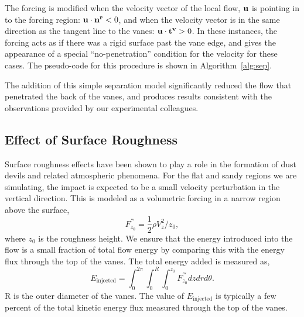 The forcing is modified when the velocity vector of the local flow, $\bf
u$ is pointing in to the forcing region: ${\bf u} \cdot {\bf n^r} < 0$, and
when the velocity vector is in the same direction as the tangent line to
the vanes: ${\bf u} \cdot {\bf t^v} > 0 $. In these instances, the
forcing acts as if there was a rigid surface past the vane edge, and
gives the appearance of a special ``no-penetration'' condition for the
velocity for these cases. The pseudo-code for this procedure is shown in
Algorithm~\ref{alg:sep}.

The addition of this simple separation model significantly reduced the
flow that penetrated the back of the vanes, and produces results
consistent with the observations provided by our experimental
colleagues.  

\subsection{Effect of Surface Roughness}


Surface roughness effects have been shown to play a role in the
formation of dust devils and related atmospheric
phenomena\cite{oke1987boundary}. For the flat and sandy regions we are
simulating, the impact is expected to be a small velocity perturbation 
in the vertical direction. This is modeled as a volumetric 
forcing in a narrow region above the surface,
\begin{equation}
 F^{'''}_{z_0} = \frac{1}{2}\rho V_z^2/z_{0}, 
\end{equation}
where $z_{0}$ is the roughness height. We ensure that the energy
introduced into the flow is a small fraction of total flow energy by comparing
this with the energy flux through the top of the vanes. The total energy
added is measured as,  
\begin{equation}
 E_{\text{injected}} = \int_0^{2\pi} \int_0^R \int_0^{z_0} F^{'''}_{z_0}
  dz dr d\theta.  
\end{equation}
R is the outer diameter of the vanes. 
The value of $E_{\text{injected}}$ is typically a few percent of the
total kinetic energy flux measured through the top of the
vanes.


